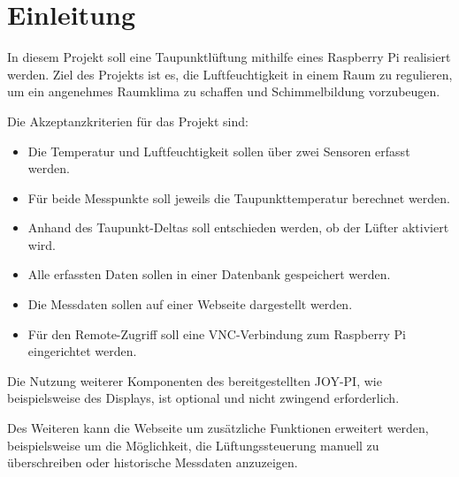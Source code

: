 \section{Einleitung}

In diesem Projekt soll eine Taupunktlüftung mithilfe eines Raspberry Pi
realisiert werden. Ziel des Projekts ist es, die Luftfeuchtigkeit in einem
Raum zu regulieren, um ein angenehmes Raumklima zu schaffen und
Schimmelbildung vorzubeugen. 

Die Akzeptanzkriterien für das Projekt sind:
\begin{itemize}
    \item Die Temperatur und Luftfeuchtigkeit sollen über zwei Sensoren erfasst werden.
    
    \item Für beide Messpunkte soll jeweils die Taupunkttemperatur berechnet werden.
    
    \item Anhand des Taupunkt-Deltas soll entschieden werden, ob der Lüfter aktiviert wird.
    
    \item Alle erfassten Daten sollen in einer Datenbank gespeichert werden.
    
    \item Die Messdaten sollen auf einer Webseite dargestellt werden.
    
    \item Für den Remote-Zugriff soll eine VNC-Verbindung zum Raspberry Pi eingerichtet werden.
\end{itemize}


Die Nutzung weiterer Komponenten des bereitgestellten JOY-PI,
wie beispielsweise des Displays, ist optional und nicht zwingend erforderlich.

Des Weiteren kann die Webseite um zusätzliche Funktionen erweitert werden,
beispielsweise um die Möglichkeit, die Lüftungssteuerung manuell zu
überschreiben oder historische Messdaten anzuzeigen.

